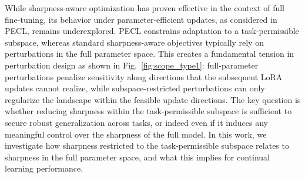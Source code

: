 \documentclass{article}
\theoremstyle{plain}
\theoremstyle{definition}
\theoremstyle{remark}
\begin{document}
While sharpness-aware optimization has proven effective in the context of full fine-tuning, its behavior under parameter-efficient updates, as considered in PECL, remains underexplored. PECL constrains adaptation to a task-permissible subspace, whereas standard sharpness-aware objectives typically rely on perturbations in the full parameter space. This creates a fundamental tension in perturbation design as shown in Fig.~\ref{fig:scope_type1}: full-parameter perturbations penalize sensitivity along directions that the subsequent LoRA updates cannot realize, while subspace-restricted perturbations can only regularize the landscape within the feasible update directions. 
The key question is whether reducing sharpness
within the task-permissible subspace
is sufficient to secure robust generalization across tasks, or indeed even if it induces any meaningful control over 
the sharpness of the full model.
In this work, we investigate how sharpness restricted to the task-permissible subspace relates to sharpness in the full parameter space, and what this implies for continual learning performance.


\end{document}
